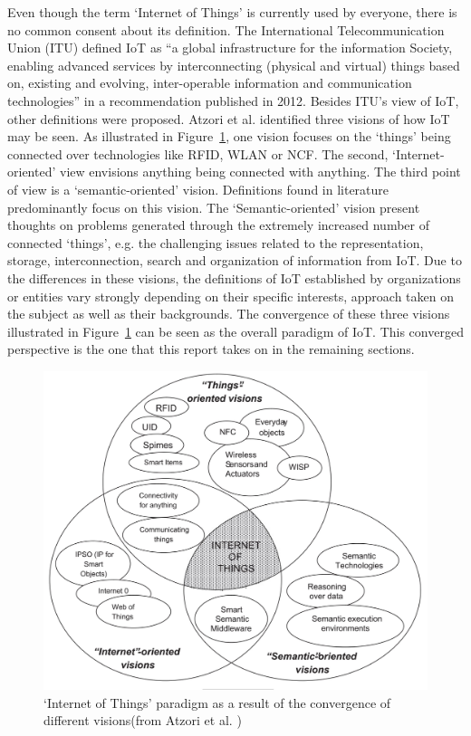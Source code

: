 	Even though the term `Internet of Things' is currently used by everyone, there is no common consent about its definition. The International Telecommunication Union (ITU) defined IoT as ``a global infrastructure for the information Society, enabling advanced services by interconnecting (physical and virtual) things based on, existing and evolving, inter-operable information and communication technologies'' \cite{itu} in a recommendation published in 2012. Besides ITU's view of IoT, other definitions were proposed. Atzori et al. \cite{atzori} identified three visions of how IoT may be seen. As illustrated in Figure~\ref{fig:iot_visions}, one vision focuses on the `things' being connected over technologies like RFID, WLAN or NCF. The second, `Internet-oriented' view envisions anything being connected with anything. The third point of view is a `semantic-oriented' vision. Definitions found in literature predominantly focus on this vision. The `Semantic-oriented' vision present thoughts on problems generated through the extremely increased number of connected `things', e.g. the challenging issues related to the representation, storage, interconnection, search and organization of information from IoT. Due to the differences in these visions, the definitions of IoT established by organizations or entities vary strongly depending on their specific interests, approach taken on the subject as well as their backgrounds. The convergence of these three visions illustrated in Figure~\ref{fig:iot_visions} can be seen as the overall paradigm of IoT. This converged perspective is the one that this report takes on in the remaining sections. 

	\begin{figure}[ht]
	    \begin{center}
	    \includegraphics[scale=0.35]{Talk11/iot_visions.jpg}
	    \end{center}
	    \caption{`Internet of Things' paradigm as a result of the convergence of different visions(from Atzori et al. \cite{atzori})}
	    \label{fig:iot_visions}
    \end{figure}

